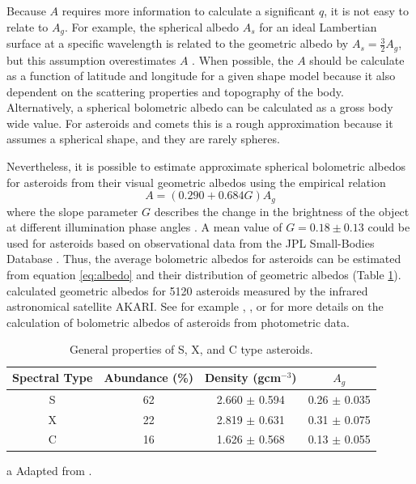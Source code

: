 \documentclass[a4paper,fleqn,usenatbib]{mnras}
\begin{document}

Because $A$ requires more information to calculate a significant $q$, it is not easy to relate to $A_g$. For example, the spherical albedo $A_s$ for an ideal Lambertian surface at a specific wavelength is related to the geometric albedo by $A_s=\frac{3}{2}A_g$, but this assumption overestimates $A$ \citep{2016ApJ...822...76D}. When possible, the $A$ should be calculate as a function of latitude and longitude for a given shape model because it also dependent on the scattering properties and topography of the body. Alternatively, a spherical bolometric albedo can be calculated as a gross body wide value. For asteroids and comets this is a rough approximation because it assumes a spherical shape, and they are rarely spheres.


Nevertheless, it is possible to estimate approximate spherical bolometric albedos for asteroids from their visual geometric albedos using the empirical relation
\begin{equation} \label{eq:albedo}
A=(0.290+0.684G)A_g
\end{equation}
where the slope parameter $G$ describes the change in the brightness of the object at different illumination phase angles \citep{2008Icar..195..674S}. A mean value of $G = 0.18 \pm 0.13$ could be used for asteroids based on observational data from the JPL Small-Bodies Database \citep{2013PhDT.......424C}. Thus, the average bolometric albedos for asteroids can be estimated from equation \ref{eq:albedo} and their distribution of geometric albedos (Table \ref{tab:asteroids}). \citet{2013ApJ...762...56U} calculated geometric albedos for 5120 asteroids measured by the infrared astronomical satellite AKARI. See for example \citet{1989aste.conf..524B}, \citet{2011LPI....42.1028S}, \citet{2013Icar..226.1252L} or \citet{2015aste.book..107D} for more details on the calculation of bolometric albedos of asteroids from photometric data.  


\begin{table}
\begin{threeparttable}
\centering
\caption{General properties of S, X, and C type asteroids.}
\begin{tabular}{ c c c c }
 \hline
 \hline
Spectral Type & Abundance (\%) & Density (gcm$^{-3}$) & $A_g$ \\
\hline
	S & 62 & 2.660 $\pm$ 0.594 & 0.26 $\pm$ 0.035 \\
	X & 22 & 2.819 $\pm$ 0.631 & 0.31 $\pm$ 0.075 \\
	C & 16 & 1.626 $\pm$ 0.568 & 0.13 $\pm$ 0.055 \\
 \hline
 \hline
\end{tabular}
\label{tab:asteroids}
	\begin{tablenotes}
	\small
\item[a]{Adapted from \citet{2013PhDT.......424C}.}
	\end{tablenotes}
\end{threeparttable}
\end{table}
\end{document}
